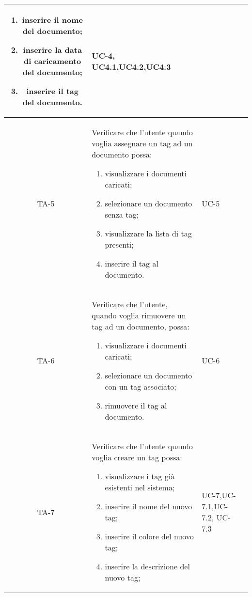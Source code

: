 \begin{xltabular}{\textwidth}{| c | X | X | c |}
\begin{enumerate}
        \item inserire il nome del documento;
        \item inserire la data di caricamento del documento;
        \item inserire il tag del documento.
    \end{enumerate}& UC-4, \newline UC4.1,\newline UC4.2,\newline UC4.3 & \textcolor{xmarkcolor}{}  \\
    \hline
     TA-5 & Verificare che l’utente quando voglia assegnare un tag ad un documento possa:
    \begin{enumerate}
        \item visualizzare i documenti caricati;
        \item selezionare un documento senza tag;
        \item visualizzare la lista di tag presenti;
        \item inserire il tag al documento.
    \end{enumerate}& UC-5 & \textcolor{xmarkcolor}{}  \\
    \hline
    TA-6 & Verificare che l’utente, quando voglia rimuovere un tag ad un documento, possa:
    \begin{enumerate}
        \item visualizzare i documenti caricati;
        \item selezionare un documento con un tag associato;
        \item rimuovere il tag al documento.
    \end{enumerate}& UC-6 & \textcolor{xmarkcolor}{}  \\
    \hline
     TA-7 & Verificare che l’utente quando voglia creare un tag possa:
    \begin{enumerate}
        \item visualizzare i tag già esistenti nel sistema;
        \item inserire il nome del nuovo tag;
        \item inserire il colore del nuovo tag;
        \item inserire la descrizione del nuovo tag;
    \end{enumerate}& UC-7,\newline UC-7.1,\newline UC-7.2, \newline UC-7.3 & \textcolor{xmarkcolor}{} \\

\end{xltabular}
